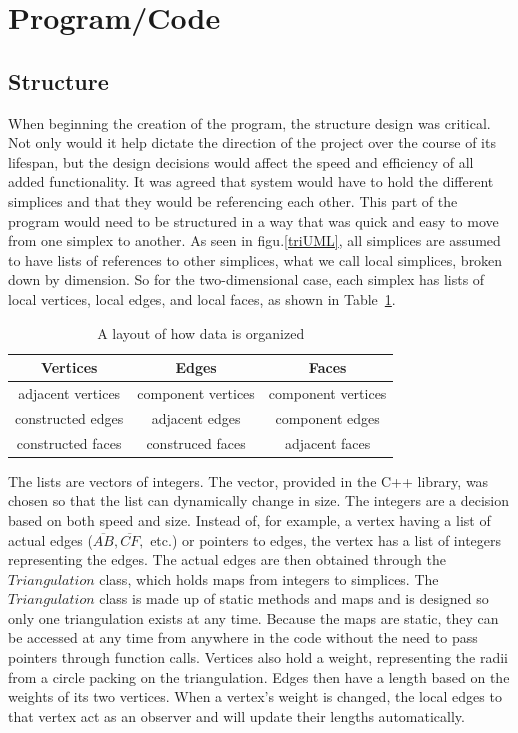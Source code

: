\documentclass[12pt]{article}
\begin{document}
\section{Program/Code}
\subsection{Structure}

When beginning the creation of the program, the structure design was critical. Not only would it help dictate the direction of the project over the course of its lifespan, but the design decisions would affect the speed and efficiency of all added functionality. It was agreed that system would have to hold the different simplices and that they would be referencing each other. This part of the program would need to be structured in a way that was quick and easy to move from one simplex to another. As seen in figu.\ref{triUML}, all simplices are assumed to have lists of references to other simplices, what we call local simplices, broken down by dimension. So for the two-dimensional case, each simplex has lists of local vertices, local edges, and local faces, as shown in Table~\ref{geomat}.\newline

  \begin{table}[b]
  \begin{center}
  \begin{tabular}{|c|c|c|}
  \hline
  Vertices & Edges & Faces\\
  \hline
  adjacent vertices & component vertices & component vertices\\
  constructed edges & adjacent edges & component edges\\
  constructed faces & construced faces & adjacent faces\\
  \hline
  \end{tabular}
  \end{center}
  \caption{A layout of how data is organized}
  \label{geomat}
  \end{table}
  
\noindent The lists are vectors of integers. The vector, provided in the C++ library, was chosen so that the list can dynamically change in size. The integers are a decision based on both speed and size. Instead of, for example, a vertex having a list of actual edges ($\overline{AB}, \overline{CF},$ etc.) or pointers to edges, the vertex has a list of integers representing the edges. The actual edges are then obtained through the $Triangulation$ class, which holds maps from integers to simplices. The $Triangulation$ class is made up of static methods and maps and is designed so only one triangulation exists at any time. Because the maps are static, they can be accessed at any time from anywhere in the code without the need to pass pointers through function calls. Vertices also hold a weight, representing the radii from a circle packing on the triangulation. Edges then have a length based on the weights of its two vertices. When a vertex's weight is changed, the local edges to that vertex act as an observer and will update their lengths automatically.\newline
\end{document}
